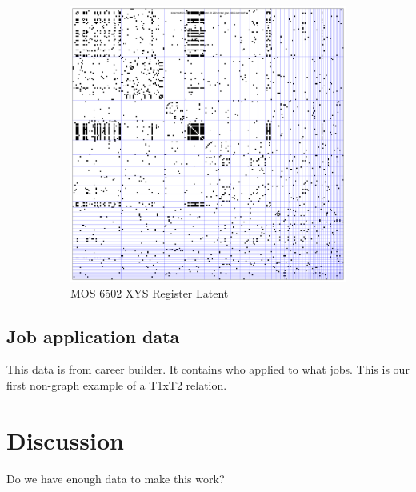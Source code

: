 \documentclass{article}
\begin{document}
\begin{figure}[h]
\begin{subfigure}[b]{0.43\textwidth}
  \includegraphics[width=\textwidth]{mos6502/mos6502.all.xysregs.ld.data-fixed_20_200-anneal_slow_400.0.latent.pdf}
  \caption{MOS 6502 XYS Register Latent}
\end{subfigure}
\caption{}
\label{}
\end{figure}




\subsection{Job application data}

This data is from career builder. It contains who applied to what
jobs. This is our first non-graph example of a T1xT2 relation.


\section{Discussion}
Do we have enough data to make this work? 
\end{document}
